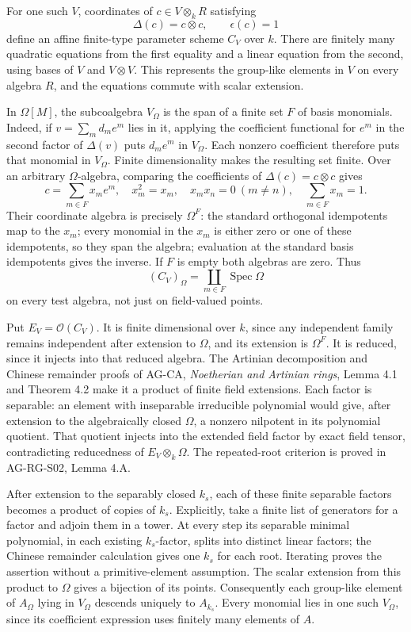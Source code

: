 \documentclass[11pt,a4paper,openany]{report}
\begin{document}
For one such \(V\), coordinates of \(c\in V\otimes_k R\) satisfying \[
 \Delta(c)=c\otimes c,\qquad\epsilon(c)=1
\] define an affine finite-type parameter scheme \(C_V\) over \(k\). There are finitely many quadratic equations from the first equality and a linear equation from the second, using bases of \(V\) and \(V\otimes V\). This represents the group-like elements in \(V\) on every algebra \(R\), and the equations commute with scalar extension.

In \(\Omega[M]\), the subcoalgebra \(V_\Omega\) is the span of a finite set \(F\) of basis monomials. Indeed, if \(v=\sum_m d_m e^m\) lies in it, applying the coefficient functional for \(e^m\) in the second factor of \(\Delta(v)\) puts \(d_m e^m\) in \(V_\Omega\). Each nonzero coefficient therefore puts that monomial in \(V_\Omega\). Finite dimensionality makes the resulting set finite. Over an arbitrary \(\Omega\)-algebra, comparing the coefficients of \(\Delta(c)=c\otimes c\) gives \[
 c=\sum_{m\in F}x_m e^m,
 \quad x_m^2=x_m,\quad x_mx_n=0\ (m\ne n),
 \quad\sum_{m\in F}x_m=1.
\] Their coordinate algebra is precisely \(\Omega^F\): the standard orthogonal idempotents map to the \(x_m\); every monomial in the \(x_m\) is either zero or one of these idempotents, so they span the algebra; evaluation at the standard basis idempotents gives the inverse. If \(F\) is empty both algebras are zero. Thus \[
 (C_V)_\Omega=\coprod_{m\in F}\operatorname{Spec}\Omega
\] on every test algebra, not just on field-valued points.

Put \(E_V=\mathcal O(C_V)\). It is finite dimensional over \(k\), since any independent family remains independent after extension to \(\Omega\), and its extension is \(\Omega^F\). It is reduced, since it injects into that reduced algebra. The Artinian decomposition and Chinese remainder proofs of AG-CA, \emph{Noetherian and Artinian rings}, Lemma 4.1 and Theorem 4.2 make it a product of finite field extensions. Each factor is separable: an element with inseparable irreducible polynomial would give, after extension to the algebraically closed \(\Omega\), a nonzero nilpotent in its polynomial quotient. That quotient injects into the extended field factor by exact field tensor, contradicting reducedness of \(E_V\otimes_k\Omega\). The repeated-root criterion is proved in AG-RG-S02, Lemma 4.A.

After extension to the separably closed \(k_s\), each of these finite separable factors becomes a product of copies of \(k_s\). Explicitly, take a finite list of generators for a factor and adjoin them in a tower. At every step its separable minimal polynomial, in each existing \(k_s\)-factor, splits into distinct linear factors; the Chinese remainder calculation gives one \(k_s\) for each root. Iterating proves the assertion without a primitive-element assumption. The scalar extension from this product to \(\Omega\) gives a bijection of its points. Consequently each group-like element of \(A_\Omega\) lying in \(V_\Omega\) descends uniquely to \(A_{k_s}\). Every monomial lies in one such \(V_\Omega\), since its coefficient expression uses finitely many elements of \(A\).
\end{document}
